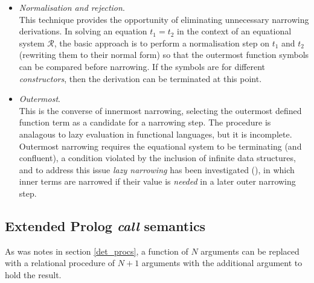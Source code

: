 \begin{itemize}
\item{\textit{Normalisation and rejection}.\\
  This technique provides the opportunity of eliminating unnecessary narrowing
  derivations.  In solving an equation $t_1 = t_2$ in the context of an
  equational system $\mathcal{R}$, the basic approach is to perform a normalisation step
  on $t_1$ and $t_2$ (rewriting them to their normal form)
  so that the outermost function symbols can be compared
  before narrowing.  If the symbols are for different \textit{constructors}, then the
  derivation can be terminated at this point.
  }

\item{\textit{Outermost}.\\
  This is the converse of innermost narrowing, selecting the outermost defined function
  term as a candidate for a narrowing step.  The procedure is analagous to lazy
  evaluation in functional languages, but it is incomplete.  Outermost narrowing
  requires the equational system to be terminating (and confluent),  a condition
  violated by the inclusion of infinite data structures, and to address this issue
  \textit{lazy narrowing} has been investigated (\cite{Red85}), in which inner terms
  are narrowed if their value is \textit{needed} in a later outer narrowing step.
  }

\end{itemize}

\subsection{Extended Prolog \textit{call} semantics}

As was notes in section \ref{det_procs}, a function of $N$ arguments can be
replaced with a relational procedure of $N+1$ arguments with the additional
argument to hold the result.

